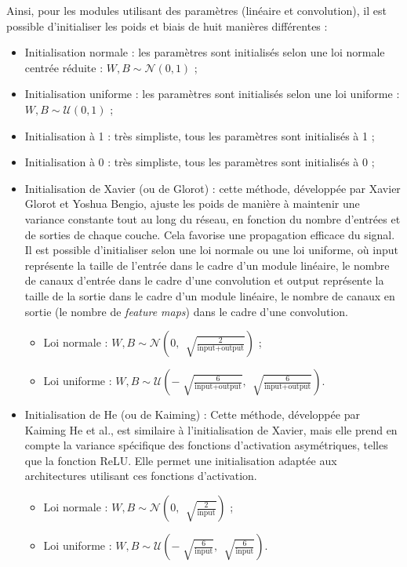 \documentclass{article}
\begin{document}
Ainsi, pour les modules utilisant des paramètres (linéaire et convolution), il est possible d'initialiser les poids et biais de huit manières différentes :

\begin{itemize}
    \item Initialisation normale : les paramètres sont initialisés selon une loi normale centrée réduite : $ W, B \sim \mathcal{N}(0, 1) $ ;
    \item Initialisation uniforme : les paramètres sont initialisés selon une loi uniforme : $ W, B \sim \mathcal{U}(0, 1) $ ;
    \item Initialisation à 1 : très simpliste, tous les paramètres sont initialisés à 1 ;
    \item Initialisation à 0 : très simpliste, tous les paramètres sont initialisés à 0 ;
    \item Initialisation de Xavier (ou de Glorot) : cette méthode, développée par Xavier Glorot et Yoshua Bengio, ajuste les poids de manière à maintenir une variance constante tout au long du réseau, en fonction du nombre d'entrées et de sorties de chaque couche. Cela favorise une propagation efficace du signal. Il est possible d'initialiser selon une loi normale ou une loi uniforme, où $ \text{input} $ représente la taille de l'entrée dans le cadre d'un module linéaire, le nombre de canaux d'entrée dans le cadre d'une convolution et $ \text{output} $ représente la taille de la sortie dans le cadre d'un module linéaire, le nombre de canaux en sortie (le nombre de \textit{feature maps}) dans le cadre d'une convolution.
    \begin{itemize}
        \item Loi normale : $ W, B \sim \mathcal{N}(0, \, \sqrt[]{\frac{2}{\text{input} + \text{output}}}) $ ;
        \item Loi uniforme : $ W, B \sim \mathcal{U}(- \sqrt[]{\frac{6}{\text{input} + \text{output}}}, \, \sqrt[]{\frac{6}{\text{input} + \text{output}}}) $.
    \end{itemize}
    \item Initialisation de He (ou de Kaiming) : Cette méthode, développée par Kaiming He et al., est similaire à l'initialisation de Xavier, mais elle prend en compte la variance spécifique des fonctions d'activation asymétriques, telles que la fonction ReLU. Elle permet une initialisation adaptée aux architectures utilisant ces fonctions d'activation. 
    \begin{itemize}
        \item Loi normale : $ W, B \sim \mathcal{N}(0, \, \sqrt[]{\frac{2}{\text{input}}}) $ ;
        \item Loi uniforme : $ W, B \sim \mathcal{U}(- \sqrt[]{\frac{6}{\text{input}}}, \, \sqrt[]{\frac{6}{\text{input}}}) $.
    \end{itemize}
\end{itemize}
\end{document}
